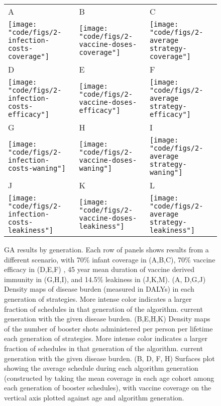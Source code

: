 \documentclass[12pt]{article}
\begin{document}
\begin{figure}

\caption{\footnotesize GA results by generation. 
Each row of panels shows results from a different scenario, with 
70\% infant coverage in (A,B,C),
70\% vaccine efficacy in (D,E,F) , 
45 year mean duration of vaccine derived immunity in (G,H,I),
and 14.5\% leakiness in (J,K,M).
(A, D,G,J) Density maps of disease burden (measured in DALYs) in each generation of strategies. 
More intense color indicates a larger fraction of schedules in that generation of the algorithm.
current generation with the given disease burden. 
(B,E,H,K) Density maps of the number of booster shots administered per person per lifetime each generation of strategies. More intense color indicates a larger fraction of schedules in that generation of the algorithm.
current generation with the given disease burden. 
(B, D, F, H) Surfaces plot showing the average schedule during each algorithm generation (constructed by taking the mean coverage in each age cohort among each 
generation of booster schedules),
with vaccine coverage on the vertical axis plotted against age and algorithm generation.
}

\begin{tabular}{lll}
A&B&C\\
\texttt{[image: "code/figs/2-infection-costs-coverage"]}&
\texttt{[image: "code/figs/2-vaccine-doses-coverage"]}&
\texttt{[image: "code/figs/2-average strategy-coverage"]} \\


D&E&F\\
\texttt{[image: "code/figs/2-infection-costs-efficacy"]}&
\texttt{[image: "code/figs/2-vaccine-doses-efficacy"]}&
\texttt{[image: "code/figs/2-average strategy-efficacy"]} \\


G&H&I\\
\texttt{[image: "code/figs/2-infection-costs-waning"]}&
\texttt{[image: "code/figs/2-vaccine-doses-waning"]}&
\texttt{[image: "code/figs/2-average strategy-waning"]} \\


J&K&L\\
\texttt{[image: "code/figs/2-infection-costs-leakiness"]}&
\texttt{[image: "code/figs/2-vaccine-doses-leakiness"]}& 
\texttt{[image: "code/figs/2-average strategy-leakiness"]} \\



\end{tabular}

\label{fig:BreakdownByGeneration}
\end{figure}
\end{document}
